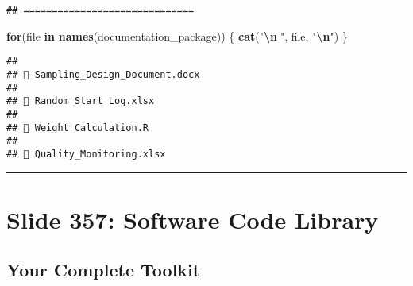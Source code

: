 \documentclass[
]{article}
\newenvironment{Shaded}{\begin{snugshade}}{\end{snugshade}}
\newcommand{\ControlFlowTok}[1]{\textcolor[rgb]{0.13,0.29,0.53}{\textbf{#1}}}
\newcommand{\FunctionTok}[1]{\textcolor[rgb]{0.13,0.29,0.53}{\textbf{#1}}}
\newcommand{\NormalTok}[1]{#1}
\newcommand{\SpecialCharTok}[1]{\textcolor[rgb]{0.81,0.36,0.00}{\textbf{#1}}}
\newcommand{\StringTok}[1]{\textcolor[rgb]{0.31,0.60,0.02}{#1}}
\begin{document}
\begin{verbatim}
## ==============================
\end{verbatim}

\begin{Shaded}
\begin{Highlighting}[]
\ControlFlowTok{for}\NormalTok{(file }\ControlFlowTok{in} \FunctionTok{names}\NormalTok{(documentation\_package)) \{}
  \FunctionTok{cat}\NormalTok{(}\StringTok{"}\SpecialCharTok{\textbackslash{}n}\StringTok{📄"}\NormalTok{, file, }\StringTok{"}\SpecialCharTok{\textbackslash{}n}\StringTok{"}\NormalTok{)}
\NormalTok{\}}
\end{Highlighting}
\end{Shaded}

\begin{verbatim}
## 
## 📄 Sampling_Design_Document.docx 
## 
## 📄 Random_Start_Log.xlsx 
## 
## 📄 Weight_Calculation.R 
## 
## 📄 Quality_Monitoring.xlsx
\end{verbatim}

\begin{center}\rule{0.5\linewidth}{0.5pt}\end{center}

\section{Slide 357: Software Code
Library}\label{slide-357-software-code-library}

\subsection{Your Complete Toolkit}\label{your-complete-toolkit}
\end{document}
